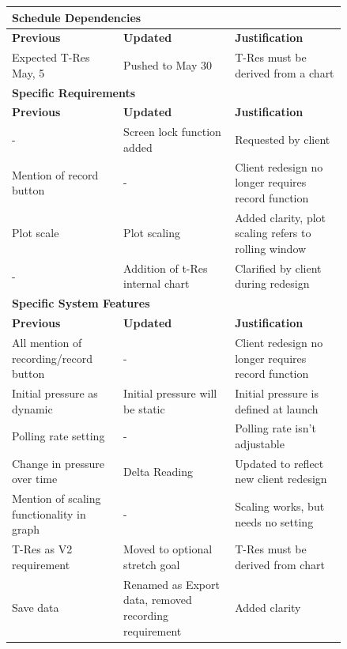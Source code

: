 \documentclass[onecolumn, draftclsnofoot,10pt, compsoc]{IEEEtran}
\begin{document}
\begin{longtable}[h]{| p{0.28\linewidth} | p{0.28\linewidth} | p{0.28\linewidth} |}
		\multicolumn{3}{l}{\textbf{Schedule Dependencies}} \\ \hline
		\textbf{Previous} & \textbf{Updated} & \textbf{Justification} \\ \hline
		Expected T-Res May, 5 & Pushed to May 30 & T-Res must be derived from a chart \\
		\hline

		\multicolumn{3}{l}{\textbf{Specific Requirements}} \\ \hline
		\textbf{Previous} & \textbf{Updated} & \textbf{Justification} \\ \hline
		- & Screen lock function added & Requested by client \\
		\hline
		Mention of record button & - & Client redesign no longer requires record function \\
		\hline
		Plot scale & Plot scaling & Added clarity, plot scaling refers to rolling window \\
		\hline
		- & Addition of t-Res internal chart & Clarified by client during redesign \\
		\hline

		\multicolumn{3}{l}{\textbf{Specific System Features}} \\ \hline
		\textbf{Previous} & \textbf{Updated} & \textbf{Justification} \\ \hline
		All mention of recording/record button & - & Client redesign no longer requires record function \\
		\hline
		Initial pressure as dynamic & Initial pressure will be static & Initial pressure is defined at launch \\
		\hline
		Polling rate setting & - & Polling rate isn't adjustable \\
		\hline
		Change in pressure over time & Delta Reading & Updated to reflect new client redesign \\
		\hline
		Mention of scaling functionality in graph & - & Scaling works, but needs no setting \\
		\hline
		T-Res as V2 requirement & Moved to optional stretch goal & T-Res must be derived from chart \\
		\hline
		Save data & Renamed as Export data, removed recording requirement & Added clarity \\
		\hline

\end{longtable}
\end{document}
